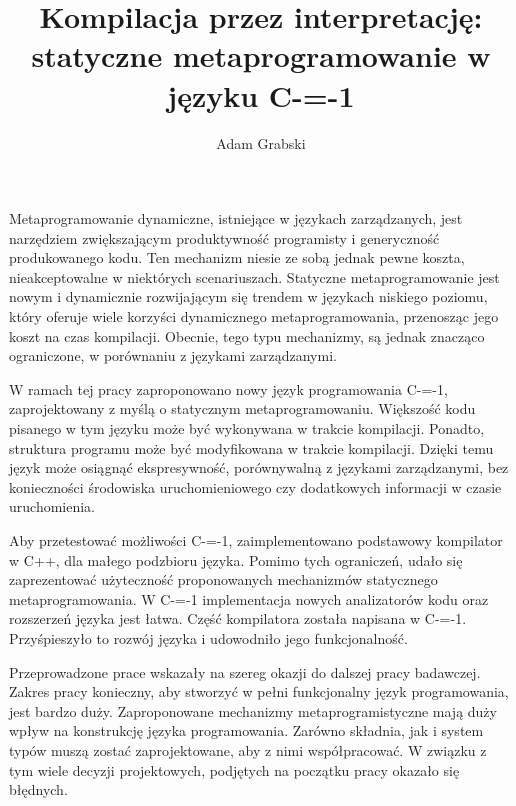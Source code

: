 \documentclass[
    left=2.5cm,         %
    right=2.5cm,        %
    top=2.5cm,          %
    bottom=3cm,         %
    bindingoffset=6mm,  %
    nohyphenation=false %
]{eiti/eiti-thesis}
\begin{document}
\MasterThesis %
{}
\title{
Kompilacja przez interpretację:\\
statyczne metaprogramowanie w języku C-=-1
}
\author{Adam Grabski}
\date{\the\year}
\maketitle

\cleardoublepage %
\streszczenie 
Metaprogramowanie dynamiczne, istniejące w językach zarządzanych, jest narzędziem zwiększającym produktywność programisty i generyczność produkowanego kodu.
Ten mechanizm niesie ze sobą jednak pewne koszta, nieakceptowalne w niektórych scenariuszach.
Statyczne metaprogramowanie jest nowym i dynamicznie rozwijającym się trendem w językach niskiego poziomu, który oferuje wiele korzyści dynamicznego metaprogramowania, przenosząc jego koszt na czas kompilacji.
Obecnie, tego typu mechanizmy, są jednak znacząco ograniczone, w porównaniu z językami zarządzanymi.

W ramach tej pracy zaproponowano nowy język programowania C-=-1, zaprojektowany z myślą o statycznym metaprogramowaniu.
Większość kodu pisanego w tym języku może być wykonywana w trakcie kompilacji.
Ponadto, struktura programu może być modyfikowana w trakcie kompilacji.
Dzięki temu język może osiągnąć ekspresywność, porównywalną z językami zarządzanymi, bez konieczności środowiska uruchomieniowego czy dodatkowych informacji w czasie uruchomienia.

Aby przetestować możliwości C-=-1, zaimplementowano podstawowy kompilator w C++, dla małego podzbioru języka.
Pomimo tych ograniczeń, udało się zaprezentować użyteczność proponowanych mechanizmów statycznego metaprogramowania.
W C-=-1 implementacja nowych analizatorów kodu oraz rozszerzeń języka jest łatwa.
Część kompilatora została napisana w C-=-1.
Przyśpieszyło to rozwój języka i udowodniło jego funkcjonalność.

Przeprowadzone prace wskazały na szereg okazji do dalszej pracy badawczej.
Zakres pracy konieczny, aby stworzyć w pełni funkcjonalny język programowania, jest bardzo duży.
Zaproponowane mechanizmy metaprogramistyczne mają duży wpływ na konstrukcję języka programowania.
Zarówno składnia, jak i system typów muszą zostać zaprojektowane, aby z nimi współpracować.
W związku z tym wiele decyzji projektowych, podjętych na początku pracy okazało się błędnych.
\end{document}

